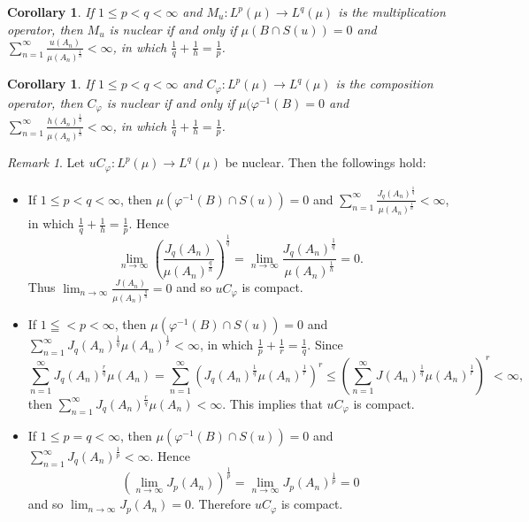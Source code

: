 \documentclass{amsart}
\newtheorem{cor}[thm]{Corollary}
\theoremstyle{definition}\newtheorem{defn}[thm]{Definition}
\theoremstyle{remark}
\newtheorem{rem}[thm]{Remark}
\numberwithin{equation}{section}
\begin{document}
\begin{cor}
 If $1\leq p<q<\infty$  and $M_u:L^p(\mu)\rightarrow L^q(\mu)$ is the multiplication operator, then $M_u$ is nuclear if and only if $\mu(B\cap S(u))=0$ and $\sum^{\infty}_{n=1}\frac{u(A_n)}{\mu(A_n)^{\frac{1}{h}}}<\infty$, in which $\frac{1}{q}+\frac{1}{h}=\frac{1}{p}$.
\end{cor}
\begin{cor}
If $1\leq p<q<\infty$  and $C_{\varphi}:L^p(\mu)\rightarrow L^q(\mu)$ is the composition operator, then $C_{\varphi}$ is nuclear if and only if $\mu(\varphi^{-1}(B)=0$ and $\sum^{\infty}_{n=1}\frac{h(A_n)^{\frac{1}{q}}}{\mu(A_n)^{\frac{1}{h}}}<\infty$, in which $\frac{1}{q}+\frac{1}{h}=\frac{1}{p}$.
\end{cor}
\begin{rem}
Let $uC_{\varphi}:L^p(\mu)\rightarrow L^q(\mu)$ be nuclear. Then the followings hold:
\begin{itemize}
  \item  If $1\leq p<q<\infty$, then $\mu(\varphi^{-1}(B)\cap S(u))=0$ and $\sum^{\infty}_{n=1}\frac{J_q(A_n)^{\frac{1}{q}}}{\mu(A_n)^{\frac{1}{h}}}<\infty$, in which $\frac{1}{q}+\frac{1}{h}=\frac{1}{p}$. Hence
      $$\lim_{n\rightarrow\infty}\left(\frac{J_q(A_n)}{\mu(A_n)^{\frac{q}{h}}}\right)^{\frac{1}{q}}=\lim_{n\rightarrow\infty}\frac{J_q(A_n)^{\frac{1}{q}}}{\mu(A_n)^{\frac{1}{h}}}=0.$$ Thus  $\lim_{n\rightarrow\infty}\frac{J(A_n)}{\mu(A_n)^{\frac{q}{h}}}=0$ and so $uC_{\varphi}$ is compact.
  \item  If $1\leqq<p<\infty$, then $\mu(\varphi^{-1}(B)\cap S(u))=0$ and $\sum^{\infty}_{n=1}J_q(A_n)^{\frac{1}{q}}\mu(A_n)^{\frac{1}{r}}<\infty$, in which $\frac{1}{p}+\frac{1}{r}=\frac{1}{q}$. Since
       $$\sum^{\infty}_{n=1}J_q(A_n)^{\frac{r}{q}}\mu(A_n)=\sum^{\infty}_{n=1}\left(J_q(A_n)^{\frac{1}{q}}\mu(A_n)^{\frac{1}{r}}\right)^r\leq\left(\sum^{\infty}_{n=1}J(A_n)^{\frac{1}{q}}\mu(A_n)^{\frac{1}{r}}\right)^r<\infty,$$
       then $\sum^{\infty}_{n=1}J_q(A_n)^{\frac{r}{q}}\mu(A_n)<\infty$. This implies that $uC_{\varphi}$ is compact.          
  \item  If $1\leq p=q<\infty$, then $\mu(\varphi^{-1}(B)\cap S(u))=0$ and $\sum^{\infty}_{n=1}J_q(A_n)^{\frac{1}{p}}<\infty$. Hence $$\left(\lim_{n\rightarrow\infty}J_p(A_n)\right)^{\frac{1}{p}}=\lim_{n\rightarrow\infty}J_p(A_n)^{\frac{1}{p}}=0$$
       and so $\lim_{n\rightarrow\infty}J_p(A_n)=0$. Therefore $uC_{\varphi}$ is compact.
\end{itemize}
\end{rem}
\end{document}
